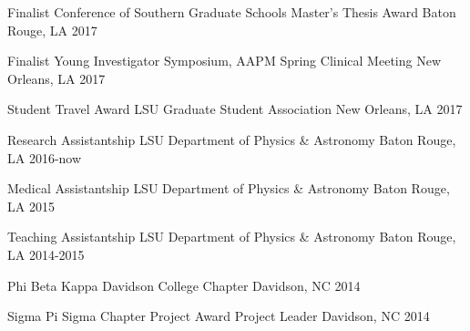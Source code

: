 



\begin{cvhonors}

  \cvhonor
    {Finalist} %
    {Conference of Southern Graduate Schools Master's Thesis Award} %
    {Baton Rouge, LA} %
    {2017} %

  \cvhonor
    {Finalist} %
    {Young Investigator Symposium, AAPM Spring Clinical Meeting} %
    {New Orleans, LA} %
    {2017} %

  \cvhonor
    {Student Travel Award} %
    {LSU Graduate Student Association} %
    {New Orleans, LA} %
    {2017} %

  \cvhonor
    {Research Assistantship} %
    {LSU Department of Physics \& Astronomy} %
    {Baton Rouge, LA} %
    {2016-now} %

  \cvhonor
    {Medical Assistantship} %
    {LSU Department of Physics \& Astronomy} %
    {Baton Rouge, LA} %
    {2015} %

  \cvhonor
    {Teaching Assistantship} %
    {LSU Department of Physics \& Astronomy} %
    {Baton Rouge, LA} %
    {2014-2015} %

  \cvhonor
    {Phi Beta Kappa} %
    {Davidson College Chapter} %
    {Davidson, NC} %
    {2014} %

  \cvhonor
    {Sigma Pi Sigma Chapter Project Award} %
    {Project Leader} %
    {Davidson, NC} %
    {2014} %


\end{cvhonors}
